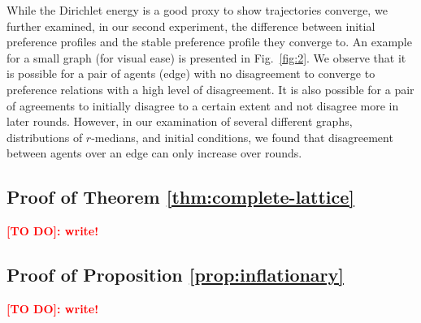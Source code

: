 \documentclass[conference]{ieeeconf}
\begin{document}
While the Dirichlet energy is a good proxy to show trajectories converge, we further examined, in our second experiment, the difference between initial preference profiles and the stable preference profile they converge to. An example for a small graph (for visual ease) is presented in Fig.~\ref{fig:2}. We observe that it is possible for a pair of agents (edge) with no disagreement to converge to preference relations with a high level of disagreement. It is also possible for a pair of agreements to initially disagree to a certain extent and not disagree more in later rounds. However, in our examination of several different graphs, distributions of $r$-medians, and initial conditions, we found that disagreement between agents over an edge can only increase over rounds.






\appendix

\subsection*{Proof of Theorem \ref{thm:complete-lattice}}
\textcolor{red}{\bf [TO DO]: write!}

\subsection*{Proof of Proposition \ref{prop:inflationary}}
\textcolor{red}{\bf [TO DO]: write!}
\end{document}
